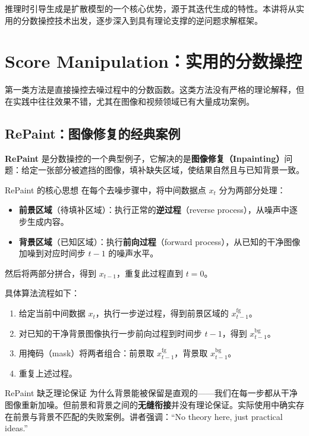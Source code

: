 \documentclass[a4paper]{article}
\begin{document}
推理时引导生成是扩散模型的一个核心优势，源于其迭代生成的特性。本讲将从实用的分数操控技术出发，逐步深入到具有理论支撑的逆问题求解框架。


\section{Score Manipulation：实用的分数操控}

第一类方法是直接操控去噪过程中的分数函数。这类方法没有严格的理论解释，但在实践中往往效果不错，尤其在图像和视频领域已有大量成功案例。

\subsection{RePaint：图像修复的经典案例}

\textbf{RePaint} 是分数操控的一个典型例子，它解决的是\textbf{图像修复（Inpainting）}问题：给定一张部分被遮挡的图像，填补缺失区域，使结果自然且与已知背景一致。

\begin{importantbox}{RePaint 的核心思想}
在每个去噪步骤中，将中间数据点 $x_t$ 分为两部分处理：
\begin{itemize}
    \item \textbf{前景区域}（待填补区域）：执行正常的\textbf{逆过程}（reverse process），从噪声中逐步生成内容。
    \item \textbf{背景区域}（已知区域）：执行\textbf{前向过程}（forward process），从已知的干净图像加噪到对应时间步 $t-1$ 的噪声水平。
\end{itemize}
然后将两部分拼合，得到 $x_{t-1}$，重复此过程直到 $t=0$。
\end{importantbox}

具体算法流程如下：
\begin{enumerate}
    \item 给定当前中间数据 $x_t$，执行一步逆过程，得到前景区域的 $x_{t-1}^{\text{fg}}$。
    \item 对已知的干净背景图像执行一步前向过程到时间步 $t-1$，得到 $x_{t-1}^{\text{bg}}$。
    \item 用掩码（mask）将两者组合：前景取 $x_{t-1}^{\text{fg}}$，背景取 $x_{t-1}^{\text{bg}}$。
    \item 重复上述过程。
\end{enumerate}

\begin{warningbox}{RePaint 缺乏理论保证}
为什么背景能被保留是直观的——我们在每一步都从干净图像重新加噪。但前景和背景之间的\textbf{无缝衔接}并没有理论保证。实际使用中确实存在前景与背景不匹配的失败案例。讲者强调：``No theory here, just practical ideas.''
\end{warningbox}
\end{document}
